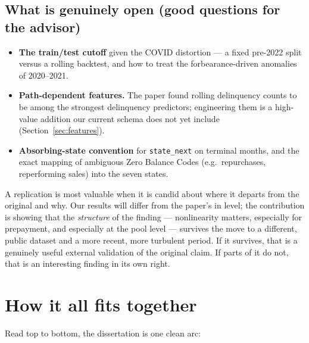 \documentclass[11pt]{article}
\begin{document}
\subsection{What is genuinely open (good questions for the advisor)}

\begin{itemize}[leftmargin=1.4em, itemsep=2pt]
  \item \textbf{The train/test cutoff} given the COVID distortion --- a fixed pre-2022 split
        versus a rolling backtest, and how to treat the forbearance-driven anomalies of
        2020--2021.
  \item \textbf{Path-dependent features.} The paper found rolling delinquency counts to be
        among the strongest delinquency predictors; engineering them is a high-value addition
        our current schema does not yet include (Section~\ref{sec:features}).
  \item \textbf{Absorbing-state convention} for \texttt{state\_next} on terminal months, and
        the exact mapping of ambiguous Zero Balance Codes (e.g.\ repurchases, reperforming
        sales) into the seven states.
\end{itemize}

\begin{intuition}
A replication is most valuable when it is candid about where it departs from the original and
why. Our results will differ from the paper's in level; the contribution is showing that the
\emph{structure} of the finding --- nonlinearity matters, especially for prepayment, and
especially at the pool level --- survives the move to a different, public dataset and a more
recent, more turbulent period. If it survives, that is a genuinely useful external validation
of the original claim. If parts of it do not, that is an interesting finding in its own right.
\end{intuition}

\section{How it all fits together}
\label{sec:recap}

Read top to bottom, the dissertation is one clean arc:
\end{document}
